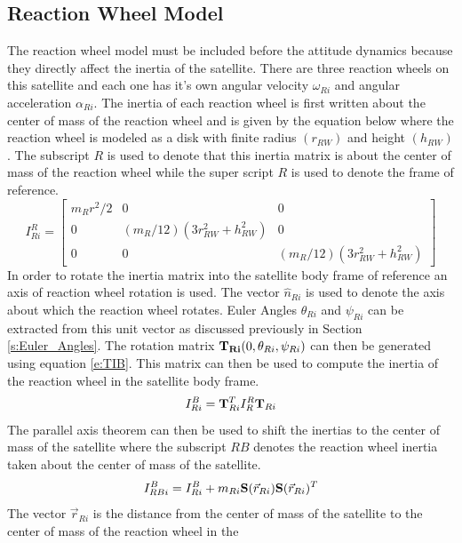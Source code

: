 \documentclass{article}
\begin{document}
\subsection{Reaction Wheel Model}

The reaction wheel model must be included before the attitude dynamics
because they directly affect the inertia of the satellite. There are
three reaction wheels on this satellite and each one has it's own
angular velocity $\omega_{Ri}$ and angular acceleration
$\alpha_{Ri}$. The inertia of each reaction wheel is first written
about the center of mass of the reaction wheel and is given by the
equation below where the reaction wheel is modeled as a disk with
finite radius $(r_{RW})$ and height $(h_{RW})$. The subscript $R$ is used to
denote that this inertia matrix is about the center of mass of the
reaction wheel while the super script $R$ is used to denote the frame
of reference. 
\begin{equation}
  I^{R}_{Ri} = \begin{bmatrix} m_{R}r^2/2 & 0 & 0 \\ 0 & (m_R/12)(3r_{RW}^2+h_{RW}^2) &
    0 \\ 0 & 0 & (m_R/12)(3r_{RW}^2+h_{RW}^2) \end{bmatrix}
\end{equation}
In order to rotate the inertia matrix into the satellite body frame of
reference an axis of reaction wheel rotation is used. The vector
$\hat{n}_{Ri}$ is used to denote the axis about which the reaction
wheel rotates. Euler Angles $\theta_{Ri}$ and $\psi_{Ri}$ can be
extracted from this unit vector as discussed previously in Section \ref{s:Euler_Angles}. The rotation
matrix ${\bf T_{Ri}}(0,\theta_{Ri},\psi_{Ri})$ can then be 
generated using equation \ref{e:TIB}. This matrix can then be used to
compute the inertia of the reaction wheel in the satellite body frame.
\begin{equation}
  I^{B}_{Ri} = {\bf T}^T_{Ri}I^{R}_R{\bf T}_{Ri}
\end{equation}
The parallel axis theorem can then be used to shift the inertias to
the center of mass of the satellite where the subscript $RB$ denotes
the reaction wheel inertia taken about the center of mass of the
satellite. 
\begin{equation}
  I^{B}_{RBi} = I^{B}_{Ri} + m_{Ri}{\bf S}(\vec{r}_{Ri}){\bf
    S}(\vec{r}_{Ri})^T
\end{equation}
The vector $\vec{r}_{Ri}$ is the distance from the center of mass of
the satellite to the center of mass of the reaction wheel in the
\end{document}
